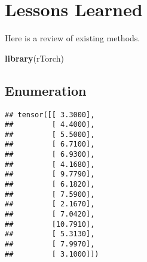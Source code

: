 \documentclass[]{book}
\newenvironment{Shaded}{\begin{snugshade}}{\end{snugshade}}
\newcommand{\CommentTok}[1]{\textcolor[rgb]{0.56,0.35,0.01}{\textit{#1}}}
\newcommand{\DataTypeTok}[1]{\textcolor[rgb]{0.13,0.29,0.53}{#1}}
\newcommand{\DecValTok}[1]{\textcolor[rgb]{0.00,0.00,0.81}{#1}}
\newcommand{\FloatTok}[1]{\textcolor[rgb]{0.00,0.00,0.81}{#1}}
\newcommand{\KeywordTok}[1]{\textcolor[rgb]{0.13,0.29,0.53}{\textbf{#1}}}
\newcommand{\NormalTok}[1]{#1}
\newcommand{\OperatorTok}[1]{\textcolor[rgb]{0.81,0.36,0.00}{\textbf{#1}}}
\newcommand{\StringTok}[1]{\textcolor[rgb]{0.31,0.60,0.02}{#1}}
\begin{document}
\hypertarget{lessons-learned}{%
\chapter{Lessons Learned}\label{lessons-learned}}

Here is a review of existing methods.

\begin{Shaded}
\begin{Highlighting}[]
\KeywordTok{library}\NormalTok{(rTorch)}
\end{Highlighting}
\end{Shaded}

\hypertarget{enumeration}{%
\section{Enumeration}\label{enumeration}}

\begin{Shaded}
\end{Shaded}

\begin{verbatim}
## tensor([[ 3.3000],
##         [ 4.4000],
##         [ 5.5000],
##         [ 6.7100],
##         [ 6.9300],
##         [ 4.1680],
##         [ 9.7790],
##         [ 6.1820],
##         [ 7.5900],
##         [ 2.1670],
##         [ 7.0420],
##         [10.7910],
##         [ 5.3130],
##         [ 7.9970],
##         [ 3.1000]])
\end{verbatim}
\end{document}
